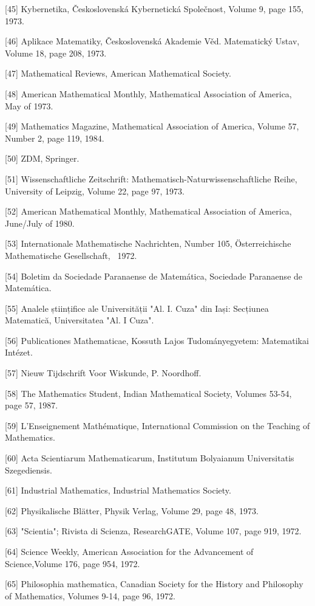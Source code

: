 \documentclass[12pt]{article}
\begin{document}
[45] Kybernetika, Československá Kybernetická Společnost, Volume 9, page 155, 1973.

[46] Aplikace Matematiky, Československá Akademie Věd. Matematický Ustav, Volume 18, page 208, 1973.

[47] Mathematical Reviews, American Mathematical Society.

[48] American Mathematical Monthly, Mathematical Association of America, May of 1973.

[49] Mathematics Magazine, Mathematical Association of America, Volume 57, Number 2, page 119, 1984.

[50] ZDM, Springer.

[51] Wissenschaftliche Zeitschrift: Mathematisch-Naturwissenschaftliche Reihe, University of Leipzig, Volume 22, page 97, 1973.

[52] American Mathematical Monthly, Mathematical Association of America, June/July of 1980. 

[53] Internationale Mathematische Nachrichten, Number 105, Österreichische Mathematische Gesellschaft,  1972.

[54] Boletim da Sociedade Paranaense de Matemática, Sociedade Paranaense de Matemática.

[55] Analele științifice ale Universității "Al. I. Cuza" din Iași: Secțiunea Matematică, Universitatea "Al. I Cuza".

[56] Publicationes Mathematicae, Kossuth Lajos Tudományegyetem: Matematikai Intézet.  

[57] Nieuw Tijdschrift Voor Wiskunde, P. Noordhoff.  

[58] The Mathematics Student, Indian Mathematical Society, Volumes 53-54, page 57, 1987.

[59] L'Enseignement Mathématique, International Commission on the Teaching of Mathematics.

[60] Acta Scientiarum Mathematicarum, Institutum Bolyaianum Universitatis Szegediensis.

[61] Industrial Mathematics, Industrial Mathematics Society.

[62] Physikalische Blätter, Physik Verlag, Volume 29, page 48, 1973.

[63] "Scientia"; Rivista di Scienza, ResearchGATE, Volume 107, page 919, 1972.

[64] Science Weekly, American Association for the Advancement of Science,Volume 176, page 954, 1972.

[65] Philosophia mathematica, Canadian Society for the History and Philosophy of Mathematics, Volumes 9-14, page 96, 1972.
\end{document}
